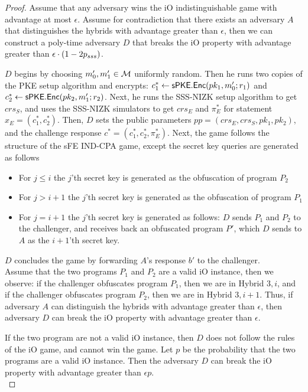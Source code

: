 \documentclass{llncs}
\begin{document}
\begin{proof}
Assume that any adversary wins the iO indistinguishable game with advantage at most $\epsilon$.
Assume for contradiction that there exists an adversary $A$ that distinguishes the hybrids with advantage greater than $\epsilon$, then we can construct a poly-time adversary $D$ that breaks the iO property with advantage greater than $\epsilon \cdot (1 - 2p_{sss})$. 

$D$ begins by choosing $m'_0,m'_1 \in \mathcal{M}$ uniformly random. Then he runs two copies of the PKE setup algorithm and encrypts: $c_1^* \leftarrow \mathsf{sPKE}.\mathsf{Enc}(pk_1,m'_0;r_1)$ and $c_2^* \leftarrow \mathsf{sPKE}.\mathsf{Enc}(pk_2,m'_1;r_2)$. Next, he runs the SSS-NIZK setup algorithm to get $crs_S$, and uses the SSS-NIZK simulators to get $crs_E$ and $\pi_E^*$ for statement $x_E=(c_1^*,c_2^*)$. Then, $D$ sets the public parameters $pp = (crs_E,crs_S,pk_1,pk_2)$, and the challenge response $c^* = (c_1^*,c_2^*,\pi_E^*)$. 
Next, the game follows the structure of the sFE IND-CPA game, except the secret key queries are generated as follows
\begin{itemize}
\item For $j \leq i$ the $j$'th secret key is generated as the obfuscation of program $P_2$
\item For $j > i+1$ the $j$'th secret key is generated as the obfuscation of program $P_1$
\item For $j=i+1$ the $j$'th secret key is generated as follows: $D$ sends $P_1$ and $P_2$ to the challenger, and receives back an obfuscated program $P'$, which $D$ sends to $A$ as the $i+1$'th secret key.
\end{itemize}
$D$ concludes the game by forwarding $A$'s response $b'$ to the challenger.  \\

Assume that the two programs $P_1$ and $P_2$ are a valid iO instance, then we observe: if the challenger obfuscates program $P_1$, then we are in Hybrid $3,i$, and if the challenger obfuscates program $P_2$, then we are in Hybrid $3,i+1$. Thus, if adversary $A$ can distinguish the hybrids with advantage greater than $\epsilon$, then adversary $D$ can break the iO property with advantage greater than $\epsilon$. 

If the two program are not a valid iO instance, then $D$ does not follow the rules of the iO game, and cannot win the game. Let $p$ be the probability that the two programs are a valid iO instance. Then the adversary $D$ can break the iO property with advantage greater than $\epsilon p$. \\


\end{proof}
\end{document}
